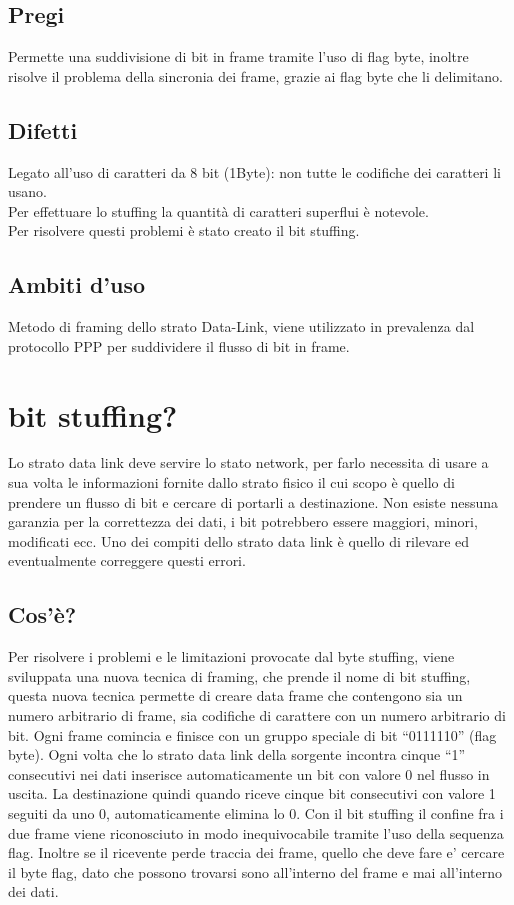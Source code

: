 \subsection{Pregi}
Permette una suddivisione di bit in frame tramite l'uso di flag byte, inoltre risolve il problema della sincronia dei frame, grazie ai flag byte che li delimitano.

\subsection{Difetti}
Legato all'uso di caratteri da 8 bit (1Byte): non tutte le codifiche dei caratteri li usano.\\
Per effettuare lo stuffing la quantità di caratteri superflui è notevole.\\
Per risolvere questi problemi è stato creato il bit stuffing.

\subsection{Ambiti d'uso}
Metodo di framing dello strato Data-Link, viene utilizzato in prevalenza dal protocollo PPP per suddividere il flusso di bit in frame.

\section{bit stuffing?}

Lo strato data link deve servire lo stato network, per farlo necessita di usare a sua volta le informazioni fornite dallo strato fisico il cui scopo è quello di prendere un flusso di bit e cercare di portarli a destinazione.
Non esiste nessuna garanzia per la correttezza dei dati, i bit potrebbero essere maggiori, minori, modificati ecc. Uno dei compiti dello strato data link è quello di rilevare ed eventualmente correggere questi errori.
\subsection{Cos'è?}
Per risolvere i problemi e le limitazioni provocate dal byte stuffing, viene sviluppata una nuova tecnica di framing, che prende il nome di bit stuffing, questa nuova tecnica permette di creare data frame che contengono sia un numero arbitrario di frame, sia codifiche di carattere con un numero arbitrario di bit.
Ogni frame comincia e finisce con un gruppo speciale di bit “0111110” (flag byte). Ogni volta che lo strato data link della sorgente incontra cinque “1” consecutivi nei dati inserisce automaticamente un bit con valore 0 nel flusso in uscita. La destinazione quindi quando riceve cinque bit consecutivi con valore 1 seguiti da uno 0, automaticamente elimina lo 0.
Con il bit stuffing il confine fra i due frame viene riconosciuto in modo inequivocabile tramite l'uso della sequenza flag. Inoltre se il ricevente perde traccia dei frame, quello che deve fare e' cercare il byte flag, dato che possono trovarsi sono all'interno del frame e mai all'interno dei dati.


